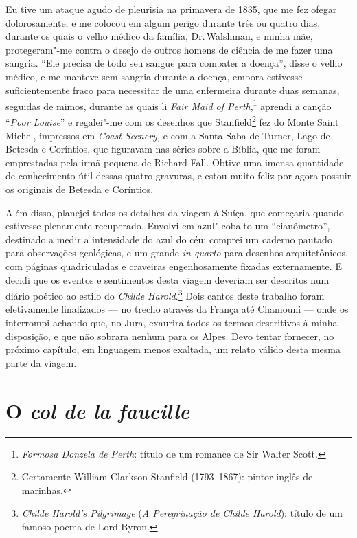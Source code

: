 Eu tive um ataque agudo de pleurisia na primavera de 1835, que me
fez ofegar dolorosamente, e me colocou em algum perigo durante três ou
quatro dias, durante os quais o velho médico da família, Dr.\,Walshman, e
minha mãe, protegeram"-me contra o desejo de outros homens de ciência de
me fazer uma sangria. ``Ele precisa de todo seu sangue para combater a
doença'', disse o velho médico, e me manteve sem sangria durante a
doença, embora estivesse suficientemente fraco para necessitar de uma
enfermeira durante duas semanas, seguidas de mimos, durante as quais li
\textit{Fair Maid of Perth},\footnote{\textit{Formosa Donzela de
  Perth}: título de um romance de Sir Walter Scott.}
aprendi a canção ``\textit{Poor Louise}'' e regalei"-me com os desenhos que
Stanfield\footnote{Certamente William Clarkson Stanfield (1793--1867):
  pintor inglês de marinhas.} fez do Monte Saint Michel,
impressos em \textit{Coast Scenery,} e com a Santa Saba de Turner, Lago de
Betesda e Coríntios, que figuravam nas séries sobre a Bíblia, que me
foram emprestadas pela irmã pequena de Richard Fall. Obtive uma imensa
quantidade de conhecimento útil dessas quatro gravuras, e estou muito
feliz por agora possuir os originais de Betesda e Coríntios.

Além disso, planejei todos os detalhes da viagem à Suíça, que começaria
quando estivesse plenamente recuperado. Envolvi em azul"-cobalto um \label{176}
``cianômetro'', destinado a medir a intensidade do azul do céu; comprei
um caderno pautado para observações geológicas, e um grande \textit{in
quarto} para desenhos arquitetônicos, com páginas quadriculadas e
craveiras engenhosamente fixadas externamente. E decidi que os eventos e
sentimentos desta viagem deveriam ser descritos num diário poético ao
estilo do \textit{Childe Harold}.\footnote{\textit{Childe Harold's
  Pilgrimage} (\textit{A Peregrinação de Childe Harold}): título de um
  famoso poema de Lord Byron.} Dois cantos deste
trabalho foram efetivamente finalizados --- no trecho através da França
até Chamouni --- onde os interrompi achando que, no Jura, exaurira todos
os termos descritivos à minha disposição, e que não sobrara nenhum para
os Alpes. Devo tentar fornecer, no próximo capítulo, em linguagem menos
exaltada, um relato válido desta mesma parte da viagem.

\chapter{O \textit{col de la faucille}} %

